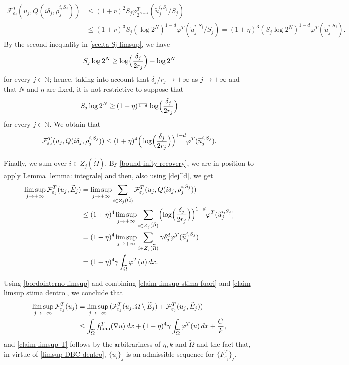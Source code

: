 \documentclass{article}
\theoremstyle{plain}
\theoremstyle{definition}
\def\NN{{\mathbb N}}
\newcommand{\f}{\varphi}
\newcommand{\ej}{\varepsilon_j}
\newcommand{\rj}{r_j}
\newcommand{\dej}{\delta_j}
\newcommand{\F}{\mathcal{F}}
\numberwithin{equation}{section}
\begin{document}
\begin{align*}
    \F^T_{\ej}(u_j, Q(i\dej,\rho_j^{i,S_j})) & \leq (1+\eta)^2S_j \f^T_{2^{N-k}}(\widetilde{u}^{i,S_j}_j/S_j) \\
    & \leq  (1+\eta)^3S_j(\log 2^N)^{1-d}\f^T(\widetilde{u}^{i,S_j}_j/S_j) = (1+\eta)^3(S_j\log 2^N)^{1-d}\f^T(\widetilde{u}^{i,S_j}_j).
\end{align*}
By the second
inequality in \eqref{scelta Sj limsup}, we have
\begin{equation*}
    S_j\log 2^N \geq \log\Bigl(\frac{\dej}{2\rj}\Bigr)-\log 2^N
\end{equation*}
for every $j\in\NN$; hence, taking into account that $\dej/\rj\to+\infty$ as $j\to+\infty$ and that $N$ and $\eta$ are fixed, it is not restrictive to suppose that
\begin{equation*}
 S_j\log 2^N \geq (1+\eta)^{\frac{1}{1-d}}\log\Bigl(\frac{\dej}{2\rj}\Bigr)
\end{equation*}
for every $j\in\NN$. We obtain that
\begin{equation*}
    \F^T_{\ej}(u_j, Q(i\dej,\rho_j^{i,S_j})) \leq (1+\eta)^4\Bigr(\log\Bigl(\frac{\dej}{2\rj}\Bigr)\Bigl)^{1-d}\f^T(\widetilde{u}^{i,S_j}_j).
\end{equation*}

Finally, we sum over $i\in Z_j(\widetilde{\Omega})$. By \eqref{bound infty recovery}, we are in position to apply Lemma \ref{lemma: integrale} and then, also using \eqref{dej^d}, we get
\begin{align} \notag
    \limsup_{j\to+\infty}\F^T_{\ej}(u_j, \widetilde{E}_j) & = \limsup_{j\to+\infty}\sum_{i\in Z_j(\widetilde{\Omega})}\F^T_{\ej}(u_j, Q(i\dej,\rho_j^{i,S_j})) \\ \notag
    & \leq (1+\eta)^4\limsup_{j\to+\infty}\sum_{i\in Z_j(\widetilde{\Omega})} \Bigl(\log\Bigl(\frac{\dej}{2\rj}\Bigr)\Bigr)^{1-d}\f^T(\widetilde{u}^{i,S_j}_j) \\
\notag    & = (1+\eta)^4\limsup_{j\to+\infty} \sum_{i\in Z_j(\widetilde{\Omega})}\gamma\dej^d\f^T(\widetilde{u}^{i,S_j}_j)  \\ \label{claim limsup stima dentro}
    & = (1+\eta)^4 \gamma\int_{\widetilde{\Omega}}\f^T(u)\,dx.
    \end{align}    

Using \eqref{bordointerno-limsup} and combining \eqref{claim limsup stima fuori} and \eqref{claim limsup stima dentro}, we conclude that
\begin{align*}    \limsup_{j\to+\infty}\F^T_{\ej}(u_j) & = \limsup_{j\to+\infty}\, (\F^T_{\ej}(u_j, \Omega\setminus \widetilde{E}_j)+\F^T_{\ej}(u_j, \widetilde{E}_j))  \\
    &  \leq \int_{\widetilde{\Omega}} f^T_{\rm hom}(\nabla u)\, dx + (1+\eta)^4\gamma\int_{\widetilde{\Omega}}\f^T(u)\,dx+\frac{C}{k},
    \end{align*}
and \eqref{claim limsup T} follows by the arbitrariness of $\eta,k$ and $\widetilde{\Omega}$ and the fact that, in virtue of \eqref{limsup DBC dentro}, $\{u_j\}_j$ is an admissible sequence for $\{F^T_{\ej}\}_j$.
\end{document}
